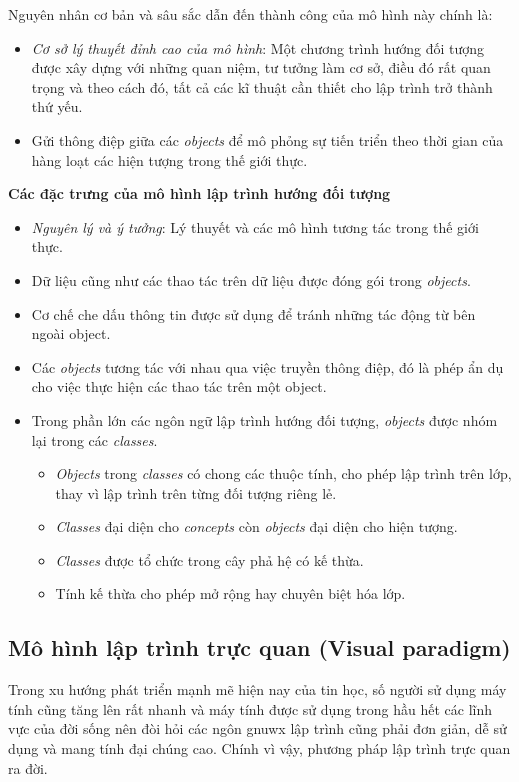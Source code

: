 \documentclass[10pt, a4paper]{article}
\begin{document}
Nguyên nhân cơ bản và sâu sắc dẫn đến thành công của mô hình này chính là:
\begin{itemize}
\item  \emph{Cơ sở lý thuyết đỉnh cao của mô hình}: Một chương trình hướng đối tượng được xây dựng với những quan niệm, tư tưởng làm cơ sở, điều đó rất quan trọng và theo cách đó, tất cả các kĩ thuật cần thiết cho lập trình trở thành thứ yếu.
\item Gửi thông điệp giữa các \emph{objects} để mô phỏng sự tiến triển theo thời gian của hàng loạt các hiện tượng trong thế giới thực.
\end{itemize}

\textbf{Các đặc trưng của mô hình lập trình hướng đối tượng}
\begin{itemize}
\item \emph{Nguyên lý và ý tưởng}: Lý thuyết và các mô hình tương tác trong thế giới thực.
\item Dữ liệu cũng như các thao tác trên dữ liệu được đóng gói trong \emph{objects}.
\item Cơ chế che dấu thông tin được sử dụng để tránh những tác động từ bên ngoài object.
\item Các \emph{objects} tương tác với nhau qua việc truyền thông điệp, đó là phép ẩn dụ cho việc thực hiện các thao tác trên một object.
\item Trong phần lớn các ngôn ngữ lập trình hướng đối tượng, \emph{objects} được nhóm lại trong các \emph{classes}.
\begin{itemize}
\item \emph{Objects} trong \emph{classes} có chong các thuộc tính, cho phép lập trình trên lớp, thay vì lập trình trên từng đối tượng riêng lẻ.
\item \emph{Classes} đại diện cho \emph{concepts} còn \emph{objects} đại diện cho hiện tượng.
\item \emph{Classes} được tổ chức trong cây phả hệ có kế thừa.
\item Tính kế thừa cho phép mở rộng hay chuyên biệt hóa lớp.
\end{itemize}
\end{itemize}

\subsection{Mô hình lập trình trực quan (Visual paradigm)}

Trong xu hướng phát triển mạnh mẽ hiện nay của tin học, số người sử dụng máy tính cũng tăng lên rất nhanh và máy tính được sử dụng trong hầu hết các lĩnh vực của đời sống nên đòi hỏi các ngôn gnuwx lập trình cũng phải đơn giản, dễ sử dụng và mang tính đại chúng cao. Chính vì vậy, phương pháp lập trình trực quan ra đời.
\end{document}
